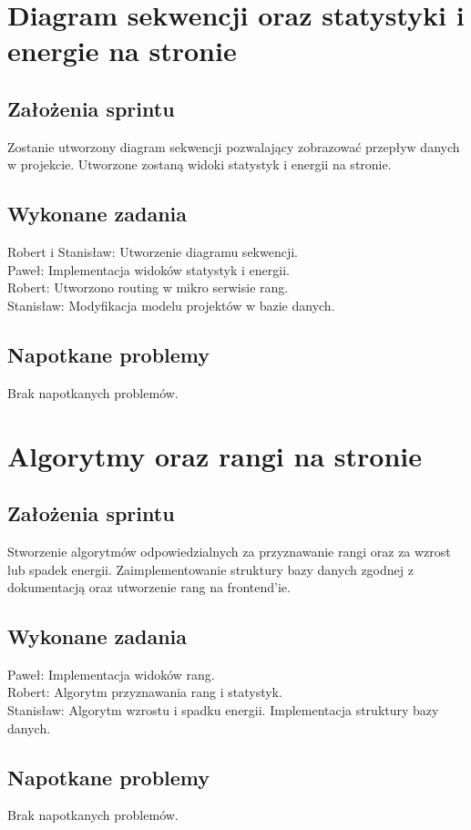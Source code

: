 \documentclass[a4paper,11pt]{report}
\begin{document}
\section {Diagram sekwencji oraz statystyki i energie na stronie}
\subsection {Założenia sprintu}
Zostanie utworzony diagram sekwencji pozwalający zobrazować przepływ danych w projekcie. Utworzone zostaną widoki statystyk i energii na stronie.
\subsection {Wykonane zadania}
Robert i Stanisław: Utworzenie diagramu sekwencji.\\
Paweł: Implementacja widoków statystyk i energii. \\
Robert: Utworzono routing w mikro serwisie rang.\\
Stanisław: Modyfikacja modelu projektów w bazie danych.\\
\subsection {Napotkane problemy}
Brak napotkanych problemów.

\section {Algorytmy oraz rangi na stronie}
\subsection {Założenia sprintu}
Stworzenie algorytmów odpowiedzialnych za przyznawanie rangi oraz za wzrost lub spadek energii. Zaimplementowanie struktury bazy danych zgodnej z dokumentacją oraz utworzenie rang na frontend'ie.
\subsection {Wykonane zadania}
Paweł: Implementacja widoków rang. \\
Robert: Algorytm przyznawania rang i statystyk.\\
Stanisław: Algorytm wzrostu i spadku energii. Implementacja struktury bazy danych.\\
\subsection {Napotkane problemy}
Brak napotkanych problemów.
\end{document}
